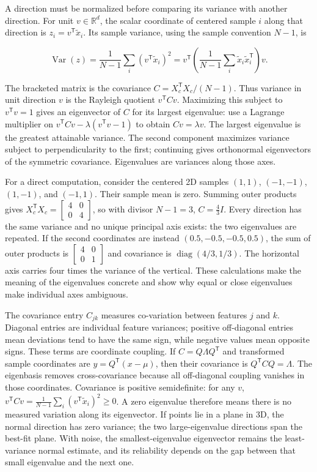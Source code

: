 A direction must be normalized before comparing its variance with another direction. For unit \(v\in\mathbb R^d\), the scalar coordinate of centered sample \(i\) along that direction is \(z_i=v^\mathsf T\tilde x_i\). Its sample variance, using the sample convention \(N-1\), is

\[
\operatorname{Var}(z)=\frac1{N-1}\sum_i(v^\mathsf T\tilde x_i)^2
=v^\mathsf T\left(\frac1{N-1}\sum_i\tilde x_i\tilde x_i^\mathsf T\right)v.
\]

The bracketed matrix is the covariance \(C=X_c^\mathsf TX_c/(N-1)\). Thus variance in unit direction \(v\) is the Rayleigh quotient \(v^\mathsf TCv\). Maximizing this subject to \(v^\mathsf Tv=1\) gives an eigenvector of \(C\) for its largest eigenvalue: use a Lagrange multiplier on \(v^\mathsf TCv-\lambda(v^\mathsf Tv-1)\) to obtain \(Cv=\lambda v\). The largest eigenvalue is the greatest attainable variance. The second component maximizes variance subject to perpendicularity to the first; continuing gives orthonormal eigenvectors of the symmetric covariance. Eigenvalues are variances along those axes.

For a direct computation, consider the centered 2D samples \((1,1)\), \((-1,-1)\), \((1,-1)\), and \((-1,1)\). Their sample mean is zero. Summing outer products gives \(X_c^\mathsf TX_c=\begin{bmatrix}4&0\\0&4\end{bmatrix}\), so with divisor \(N-1=3\), \(C=\frac43I\). Every direction has the same variance and no unique principal axis exists: the two eigenvalues are repeated. If the second coordinates are instead \((0.5,-0.5,-0.5,0.5)\), the sum of outer products is \(\begin{bmatrix}4&0\\0&1\end{bmatrix}\) and covariance is \(\operatorname{diag}(4/3,1/3)\). The horizontal axis carries four times the variance of the vertical. These calculations make the meaning of the eigenvalues concrete and show why equal or close eigenvalues make individual axes ambiguous.

The covariance entry \(C_{jk}\) measures co-variation between features \(j\) and \(k\). Diagonal entries are individual feature variances; positive off-diagonal entries mean deviations tend to have the same sign, while negative values mean opposite signs. These terms are coordinate coupling. If \(C=Q\Lambda Q^\mathsf T\) and transformed sample coordinates are \(y=Q^\mathsf T(x-\mu)\), then their covariance is \(Q^\mathsf TCQ=\Lambda\). The eigenbasis removes cross-covariance because all off-diagonal coupling vanishes in those coordinates. Covariance is positive semidefinite: for any \(v\), \(v^\mathsf TCv=\frac1{N-1}\sum_i(v^\mathsf T\tilde x_i)^2\ge0\). A zero eigenvalue therefore means there is no measured variation along its eigenvector. If points lie in a plane in 3D, the normal direction has zero variance; the two large-eigenvalue directions span the best-fit plane. With noise, the smallest-eigenvalue eigenvector remains the least-variance normal estimate, and its reliability depends on the gap between that small eigenvalue and the next one.

